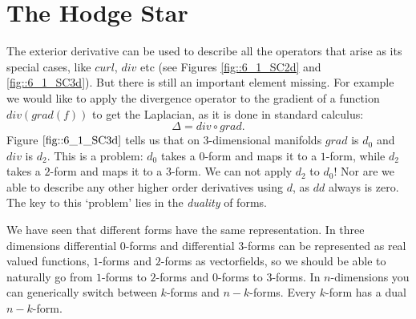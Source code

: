 \section{The Hodge Star}

\label{sec:hodgeStar}
The exterior derivative can be used to describe all the operators that arise as its special cases, like $curl$, $div$ etc (see Figures \ref{fig::6_1_SC2d} and \ref{fig::6_1_SC3d}). But there is still an important element missing. For example we would like to apply the divergence operator to the gradient of a function $div(grad(f))$ to get the Laplacian, as it is done in standard calculus:
\[\Delta = div\circ grad.\]
Figure $\ref{fig::6_1_SC3d}$ tells us that on 3-dimensional manifolds $grad$ is $d_0$ and $div$ is $d_2$.   This is a problem: $d_0$ takes a $0$-form and maps it to a $1$-form, while $d_2$ takes a $2$-form and maps it to a $3$-form. We can not apply $d_2$ to $d_0$! Nor are we able to describe any other higher order derivatives using $d$, as $dd$ always is zero.
The key to this `problem' lies in the \emph{duality} of forms. 

We have seen that different forms have the same representation. In three dimensions differential $0$-forms and differential $3$-forms can be represented as real valued functions, $1$-forms and $2$-forms as vectorfields, so we should be able to naturally go from $1$-forms to $2$-forms and $0$-forms to $3$-forms. In $n$-dimensions you can generically switch between $k$-forms and $n-k$-forms. Every $k$-form has a dual $n-k$-form.

